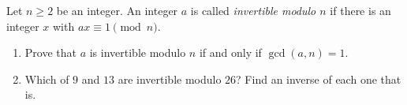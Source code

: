 Let $n\ge2$ be an integer. An integer $a$ is called \emph{invertible modulo $n$} if there is an integer $x$ with $ax\equiv1\pmod n$.
\begin{enumerate}
\item[(a)] Prove that $a$ is invertible modulo $n$ if and only if $\gcd(a,n)=1$.
\item[(b)] Which of $9$ and $13$ are invertible modulo $26$? Find an inverse of each one that is.
\end{enumerate}
